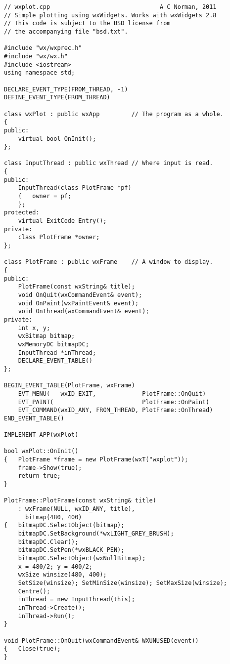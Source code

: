 {\small\begin{verbatim}
// wxplot.cpp                               A C Norman, 2011
// Simple plotting using wxWidgets. Works with wxWidgets 2.8
// This code is subject to the BSD license from
// the accompanying file "bsd.txt".

#include "wx/wxprec.h"
#include "wx/wx.h"
#include <iostream>
using namespace std;

DECLARE_EVENT_TYPE(FROM_THREAD, -1)
DEFINE_EVENT_TYPE(FROM_THREAD)

class wxPlot : public wxApp         // The program as a whole.
{
public:
    virtual bool OnInit();
};

class InputThread : public wxThread // Where input is read.
{
public:
    InputThread(class PlotFrame *pf)
    {   owner = pf;
    };
protected:
    virtual ExitCode Entry();
private:
    class PlotFrame *owner;
};

class PlotFrame : public wxFrame    // A window to display.
{
public:
    PlotFrame(const wxString& title);
    void OnQuit(wxCommandEvent& event);
    void OnPaint(wxPaintEvent& event);
    void OnThread(wxCommandEvent& event);
private:
    int x, y;
    wxBitmap bitmap;
    wxMemoryDC bitmapDC;
    InputThread *inThread;
    DECLARE_EVENT_TABLE()
};

BEGIN_EVENT_TABLE(PlotFrame, wxFrame)
    EVT_MENU(   wxID_EXIT,             PlotFrame::OnQuit)
    EVT_PAINT(                         PlotFrame::OnPaint)
    EVT_COMMAND(wxID_ANY, FROM_THREAD, PlotFrame::OnThread)
END_EVENT_TABLE()

IMPLEMENT_APP(wxPlot)

bool wxPlot::OnInit()
{   PlotFrame *frame = new PlotFrame(wxT("wxplot"));
    frame->Show(true);
    return true;
}

PlotFrame::PlotFrame(const wxString& title)
    : wxFrame(NULL, wxID_ANY, title),
      bitmap(480, 400)
{   bitmapDC.SelectObject(bitmap);
    bitmapDC.SetBackground(*wxLIGHT_GREY_BRUSH);
    bitmapDC.Clear();
    bitmapDC.SetPen(*wxBLACK_PEN);
    bitmapDC.SelectObject(wxNullBitmap);
    x = 480/2; y = 400/2;
    wxSize winsize(480, 400);
    SetSize(winsize); SetMinSize(winsize); SetMaxSize(winsize);
    Centre();
    inThread = new InputThread(this);
    inThread->Create();
    inThread->Run();
}

void PlotFrame::OnQuit(wxCommandEvent& WXUNUSED(event))
{   Close(true);
}


\end{verbatim}}
